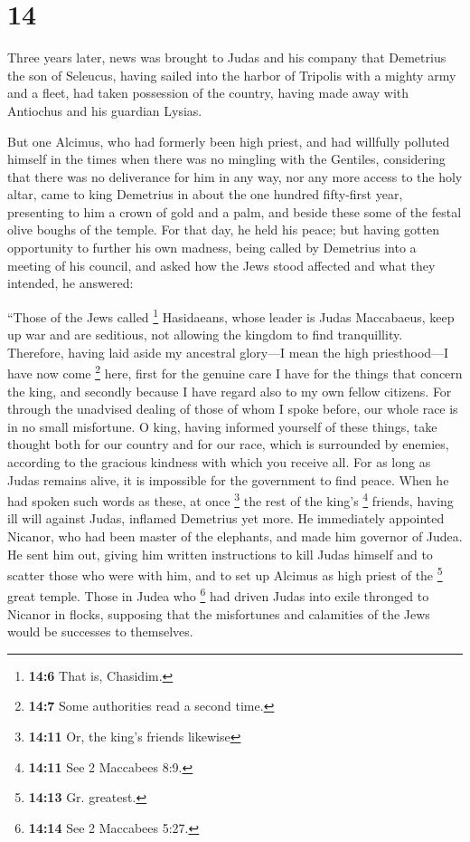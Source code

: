 \hypertarget{section-13}{%
\section{14}\label{section-13}}

 Three years later, news was brought to Judas and his
company that Demetrius the son of Seleucus, having sailed into the
harbor of Tripolis with a mighty army and a fleet,  had
taken possession of the country, having made away with Antiochus and his
guardian Lysias.

 But one Alcimus, who had formerly been high priest, and
had willfully polluted himself in the times when there was no mingling
with the Gentiles, considering that there was no deliverance for him in
any way, nor any more access to the holy altar,  came to
king Demetrius in about the one hundred fifty-first year, presenting to
him a crown of gold and a palm, and beside these some of the festal
olive boughs of the temple. For that day, he held his peace;
 but having gotten opportunity to further his own madness,
being called by Demetrius into a meeting of his council, and asked how
the Jews stood affected and what they intended, he answered:

 ``Those of the Jews called \footnote{\textbf{14:6} That
  is, Chasidim.} Hasidaeans, whose leader is Judas Maccabaeus, keep up
war and are seditious, not allowing the kingdom to find tranquillity.
 Therefore, having laid aside my ancestral glory---I mean
the high priesthood---I have now come \footnote{\textbf{14:7} Some
  authorities read a second time.} here,  first for the
genuine care I have for the things that concern the king, and secondly
because I have regard also to my own fellow citizens. For through the
unadvised dealing of those of whom I spoke before, our whole race is in
no small misfortune.  O king, having informed yourself of
these things, take thought both for our country and for our race, which
is surrounded by enemies, according to the gracious kindness with which
you receive all.  For as long as Judas remains alive, it
is impossible for the government to find peace.  When he
had spoken such words as these, at once \footnote{\textbf{14:11} Or, the
  king's friends likewise} the rest of the king's \footnote{\textbf{14:11}
  See 2 Maccabees 8:9.} friends, having ill will against Judas, inflamed
Demetrius yet more.  He immediately appointed Nicanor,
who had been master of the elephants, and made him governor of Judea. He
sent him out,  giving him written instructions to kill
Judas himself and to scatter those who were with him, and to set up
Alcimus as high priest of the \footnote{\textbf{14:13} Gr. greatest.}
great temple.  Those in Judea who \footnote{\textbf{14:14}
  See 2 Maccabees 5:27.} had driven Judas into exile thronged to Nicanor
in flocks, supposing that the misfortunes and calamities of the Jews
would be successes to themselves.

